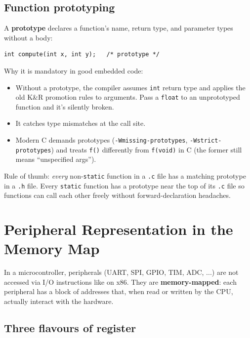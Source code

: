 \documentclass[11pt,a4paper]{article}
\begin{document}
\subsection{Function prototyping}

A \textbf{prototype} declares a function's name, return type, and parameter
types without a body:
\begin{lstlisting}[style=C]
int compute(int x, int y);   /* prototype */
\end{lstlisting}

Why it is mandatory in good embedded code:
\begin{itemize}[leftmargin=*]
    \item Without a prototype, the compiler assumes \texttt{int} return type
    and applies the old K\&R promotion rules to arguments. Pass a
    \texttt{float} to an unprototyped function and it's silently broken.
    \item It catches type mismatches at the call site.
    \item Modern C demands prototypes (\texttt{-Wmissing-prototypes},
    \texttt{-Wstrict-prototypes}) and treats \texttt{f()} differently from
    \texttt{f(void)} in C (the former still means ``unspecified args'').
\end{itemize}

\begin{note}
Rule of thumb: \emph{every} non-\texttt{static} function in a \texttt{.c}
file has a matching prototype in a \texttt{.h} file. Every \texttt{static}
function has a prototype near the top of its \texttt{.c} file so functions
can call each other freely without forward-declaration headaches.
\end{note}

\section{Peripheral Representation in the Memory Map}

In a microcontroller, peripherals (UART, SPI, GPIO, TIM, ADC, ...) are not
accessed via I/O instructions like on x86. They are \textbf{memory-mapped}:
each peripheral has a block of addresses that, when read or written by the
CPU, actually interact with the hardware.

\subsection{Three flavours of register}
\end{document}

